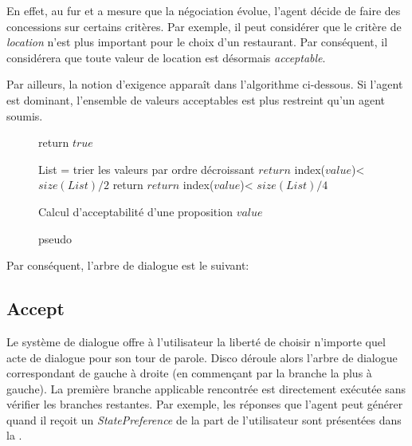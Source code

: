 			En effet, au fur et a mesure que la négociation évolue, l'agent décide de faire des concessions sur certains critères. Par exemple, il peut considérer que le critère de \emph{location} n'est plus important pour le choix d'un restaurant. Par conséquent, il considérera que toute valeur de location est désormais \emph{acceptable}.
			
			Par ailleurs, la notion d'exigence apparaît dans l'algorithme ci-dessous. Si l'agent est dominant, l'ensemble de valeurs acceptables est plus restreint qu'un agent soumis.
			
					\begin{figure}[]
				\begin{algorithmic}[1]\small
					\State return $true$
					\EndIf
					
					\State List = trier les valeurs par ordre décroissant
					\State $return$ index($value$)< $size(List)/2$
					\EndIf
					\State return $return$ index($value$)< $size(List)/4$
					\EndIf
					\EndFunction
				\end{algorithmic}
				\vskip 8pt
				\caption{pseudo}{Calcul d'acceptabilité d'une proposition $value$}
			\end{figure} 
			
			Par conséquent, l'arbre de dialogue est le suivant:
		\subsection{Accept }
				
			Le système de dialogue offre à l'utilisateur la liberté de choisir n'importe quel acte de dialogue pour son tour de parole. Disco déroule alors l'arbre de dialogue correspondant de gauche à droite (en commençant par la branche la plus à gauche). La première branche applicable rencontrée est directement exécutée sans vérifier les branches restantes.
		Par exemple, les réponses que l'agent peut générer quand il reçoit un \emph{StatePreference} de la part de l'utilisateur sont présentées dans la .
	
	
	
	
